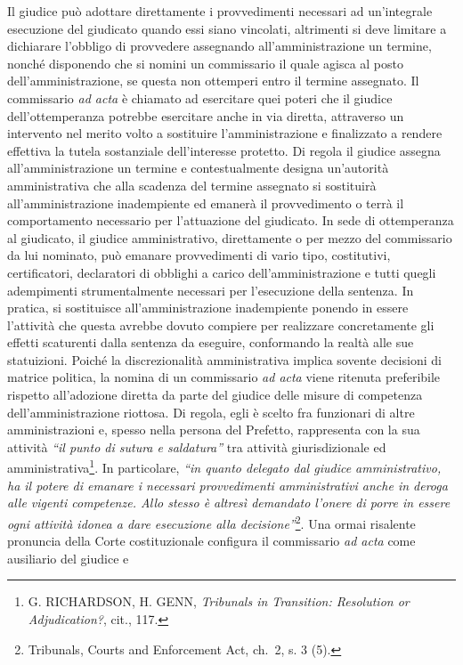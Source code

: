 \documentclass[12pt,it,a4paper,]{report}
\begin{document}
Il giudice può adottare direttamente i provvedimenti necessari ad
un'integrale esecuzione del giudicato quando essi siano vincolati,
altrimenti si deve limitare a dichiarare l'obbligo di provvedere
assegnando all'amministrazione un termine, nonché disponendo che si
nomini un commissario il quale agisca al posto dell'amministrazione, se
questa non ottemperi entro il termine assegnato. Il commissario \emph{ad
acta} è chiamato ad esercitare quei poteri che il giudice
dell'ottemperanza potrebbe esercitare anche in via diretta, attraverso
un intervento nel merito volto a sostituire l'amministrazione e
finalizzato a rendere effettiva la tutela sostanziale dell'interesse
protetto. Di regola il giudice assegna all'amministrazione un termine e
contestualmente designa un'autorità amministrativa che alla scadenza del
termine assegnato si sostituirà all'amministrazione inadempiente ed
emanerà il provvedimento o terrà il comportamento necessario per
l'attuazione del giudicato. In sede di ottemperanza al giudicato, il
giudice amministrativo, direttamente o per mezzo del commissario da lui
nominato, può emanare provvedimenti di vario tipo, costitutivi,
certificatori, declaratori di obblighi a carico dell'amministrazione e
tutti quegli adempimenti strumentalmente necessari per l'esecuzione
della sentenza. In pratica, si sostituisce all'amministrazione
inadempiente ponendo in essere l'attività che questa avrebbe dovuto
compiere per realizzare concretamente gli effetti scaturenti dalla
sentenza da eseguire, conformando la realtà alle sue statuizioni. Poiché
la discrezionalità amministrativa implica sovente decisioni di matrice
politica, la nomina di un commissario \emph{ad acta} viene ritenuta
preferibile rispetto all'adozione diretta da parte del giudice delle
misure di competenza dell'amministrazione riottosa. Di regola, egli è
scelto fra funzionari di altre amministrazioni e, spesso nella persona
del Prefetto, rappresenta con la sua attività \emph{``il punto di sutura
e saldatura''} tra attività giurisdizionale ed
amministrativa\footnote{G. RICHARDSON, H. GENN, \emph{Tribunals in
  Transition: Resolution or Adjudication?}, cit., 117.}. In particolare,
\emph{``in quanto delegato dal giudice amministrativo, ha il potere di
emanare i necessari provvedimenti amministrativi anche in deroga alle
vigenti competenze. Allo stesso è altresì demandato l'onere di porre in
essere ogni attività idonea a dare esecuzione alla
decisione''}\footnote{Tribunals, Courts and Enforcement Act, ch.~2, s. 3
  (5).}. Una ormai risalente pronuncia della Corte costituzionale
configura il commissario \emph{ad acta} come ausiliario del giudice e
\end{document}
